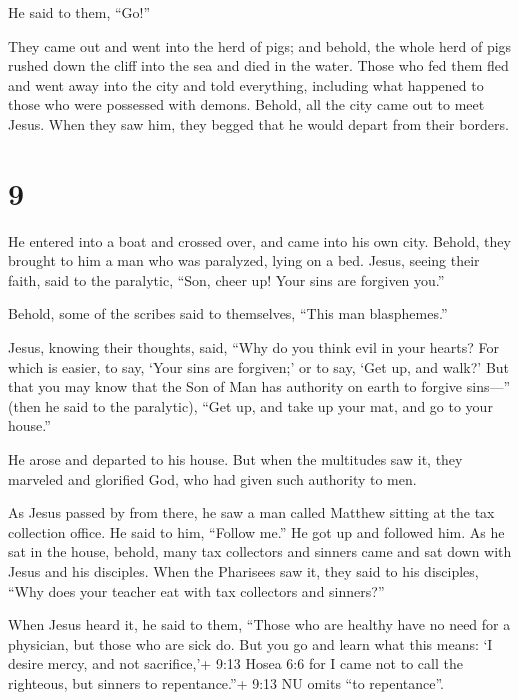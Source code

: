  He said to them, ``Go!''

They came out and went into the herd of pigs; and behold, the whole herd
of pigs rushed down the cliff into the sea and died in the water.
 Those who fed them fled and went away into the city and
told everything, including what happened to those who were possessed
with demons.  Behold, all the city came out to meet Jesus.
When they saw him, they begged that he would depart from their borders.

\hypertarget{section-8}{%
\section{9}\label{section-8}}

 He entered into a boat and crossed over, and came into his
own city.  Behold, they brought to him a man who was
paralyzed, lying on a bed. Jesus, seeing their faith, said to the
paralytic, ``Son, cheer up! Your sins are forgiven you.''

 Behold, some of the scribes said to themselves, ``This man
blasphemes.''

 Jesus, knowing their thoughts, said, ``Why do you think
evil in your hearts?  For which is easier, to say, `Your
sins are forgiven;' or to say, `Get up, and walk?'  But that
you may know that the Son of Man has authority on earth to forgive
sins---'' (then he said to the paralytic), ``Get up, and take up your
mat, and go to your house.''

 He arose and departed to his house.  But when
the multitudes saw it, they marveled and glorified God, who had given
such authority to men.

 As Jesus passed by from there, he saw a man called Matthew
sitting at the tax collection office. He said to him, ``Follow me.'' He
got up and followed him.  As he sat in the house, behold,
many tax collectors and sinners came and sat down with Jesus and his
disciples.  When the Pharisees saw it, they said to his
disciples, ``Why does your teacher eat with tax collectors and
sinners?''

 When Jesus heard it, he said to them, ``Those who are
healthy have no need for a physician, but those who are sick do.
 But you go and learn what this means: `I desire mercy, and
not sacrifice,'+ 9:13 Hosea 6:6 for I came not to call the righteous,
but sinners to repentance.''+ 9:13 NU omits ``to repentance''.

